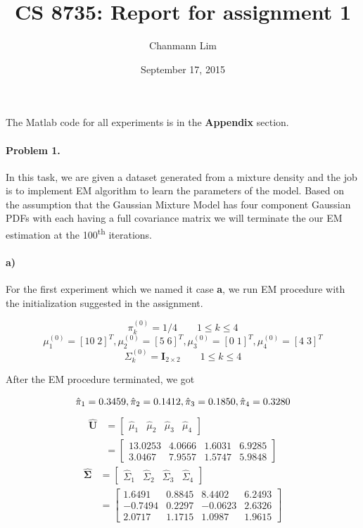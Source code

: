 \documentclass[a4paper]{article}
\begin{document}
\title{CS 8735: Report for assignment 1}
\author{Chanmann Lim}
\date{September 17, 2015}
\maketitle

\noindent The Matlab code for all experiments is in the \textbf{Appendix} section.

\paragraph{Problem 1.} In this task, we are given a dataset generated from a mixture density and the job is to implement EM algorithm to learn the parameters of the model. Based on the assumption that the Gaussian Mixture Model has four component Gaussian PDFs with each having a full covariance matrix we will terminate the our EM estimation at the 100\textsuperscript{th} iterations. \\

\paragraph{a) } For the first experiment which we named it case \textbf{a}, we run EM procedure with the initialization suggested in the assignment.

$$ \pi_k^{(0)} = 1/4 \qquad 1 \le k \le 4 $$
$$ \mu_1^{(0)} = [10\;2]^T, \mu_2^{(0)} = [5\;6]^T, \mu_3^{(0)} = [0\;1]^T, \mu_4^{(0)} = [4\;3]^T $$
$$ \Sigma_k^{(0)} = \mathbf{I}_{2\times2} \qquad 1 \le k \le 4 $$

After the EM procedure terminated, we got

\begin{equation}
	\hat{\pi}_1 = 0.3459, \hat{\pi}_2 = 0.1412, \hat{\pi}_3 = 0.1850, \hat{\pi}_4 = 0.3280\\
\end{equation}
\begin{align}
	\mathbf{\hat{U}} &= \begin{bmatrix}
							\hat{\mu}_1 & \hat{\mu}_2 & \hat{\mu}_3 & \hat{\mu}_4 
						\end{bmatrix} \\
					 & = \begin{bmatrix}
							13.0253  &  4.0666  &  1.6031  &  6.9285 \\
						    3.0467   & 7.9557  &  1.5747  &  5.9848
						 \end{bmatrix}
\end{align}
\begin{align}
	\mathbf{\hat{\Sigma}} &= \begin{bmatrix}
								\hat{\Sigma}_1 & \hat{\Sigma}_2 & \hat{\Sigma}_3 & \hat{\Sigma}_4 
							 \end{bmatrix} \\
						  & = \begin{bmatrix}
								    1.6491  &  0.8845  &  8.4402  &  6.2493 \\
								   -0.7494  &  0.2297  & -0.0623  &  2.6326 \\
								    2.0717  &  1.1715  &  1.0987  &  1.9615
						 	  \end{bmatrix}
\end{align}
\end{document}
